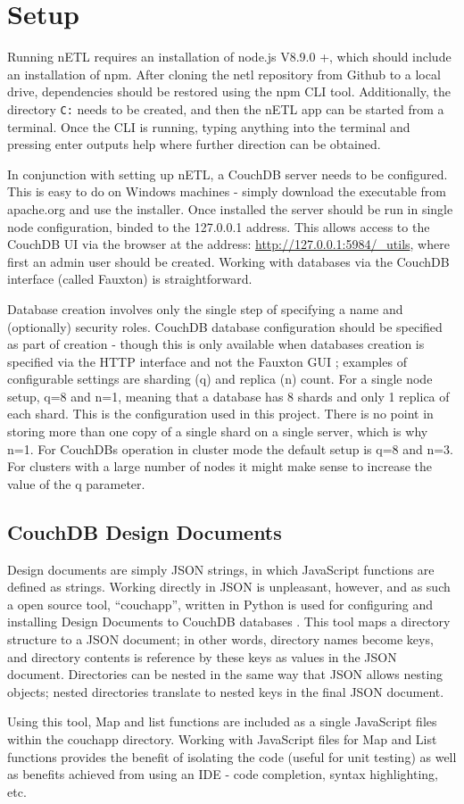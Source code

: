 \section{Setup}
Running nETL requires an installation of node.js V8.9.0 +, which should include an installation of npm. After cloning the netl repository from Github to a local drive, dependencies should be restored using the npm CLI tool. Additionally, the directory \texttt{C:\log} needs to be created, and then the nETL app can be started from a terminal. Once the CLI is running, typing anything into the terminal and pressing enter outputs help where further direction can be obtained.

In conjunction with setting up nETL, a CouchDB server needs to be configured. This is easy to do on Windows machines - simply download the executable from apache.org and use the installer. Once installed the server should be run in single node configuration, binded to the 127.0.0.1 address. This allows access to the CouchDB UI via the browser at the address: \url{http://127.0.0.1:5984/\_utils}, where first an admin user should be created. Working with databases via the CouchDB interface (called Fauxton) is straightforward.

Database creation involves only the single step of specifying a name and (optionally) security roles. CouchDB database configuration should be specified as part of creation - though this is only available when databases creation is specified via the HTTP interface and not the Fauxton GUI \cite{xxx}; examples of configurable settings are sharding (q) and replica (n) count. For a single node setup, q=8 and n=1, meaning that a database has 8 shards and only 1 replica of each shard. This is the configuration used in this project. There is no point in storing more than one copy of a single shard on a single server, which is why n=1. For CouchDBs operation in cluster mode the default setup is q=8 and n=3. For clusters with a large number of nodes it might make sense to increase the value of the q parameter.

\subsection{CouchDB Design Documents}
Design documents are simply JSON strings, in which JavaScript functions are defined as strings. Working directly in JSON is unpleasant, however, and as such a open source tool, ``couchapp'', written in Python is used for configuring and installing Design Documents to CouchDB databases \cite{pythonCouchapp}. This tool maps a directory structure to a JSON document; in other words, directory names become keys, and directory contents is reference by these keys as values in the JSON document. Directories can be nested in the same way that JSON allows nesting objects; nested directories translate to nested keys in the final JSON document.

Using this tool, Map and list functions are included as a single JavaScript files within the couchapp directory. Working with JavaScript files for Map and List functions provides the benefit of isolating the code (useful for unit testing) as well as benefits achieved from using an IDE - code completion, syntax highlighting, etc.